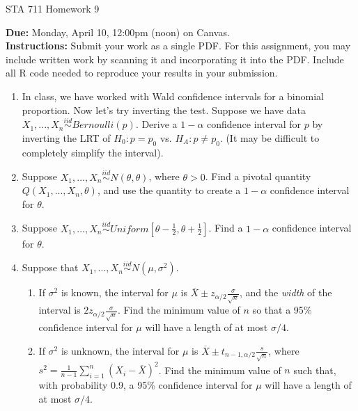 \documentclass[11pt]{article}
\begin{document}
\begin{center}
\Large
STA 711 Homework 9\\
\normalsize
\vspace{5mm}
\end{center}

\noindent \textbf{Due:} Monday, April 10, 12:00pm (noon) on Canvas.\\ 

\noindent \textbf{Instructions:} Submit your work as a single PDF. For this assignment, you may include written work by scanning it and incorporating it into the PDF. Include all R code needed to reproduce your results in your submission.


\begin{enumerate}
\item In class, we have worked with Wald confidence intervals for a binomial proportion. Now let's try inverting the test. Suppose we have data $X_1,...,X_n \overset{iid}{\sim} Bernoulli(p)$. Derive a $1 - \alpha$ confidence interval for $p$ by inverting the LRT of $H_0: p = p_0$ vs. $H_A: p \neq p_0$. (It may be difficult to completely simplify the interval).

\item Suppose $X_1,...,X_n \overset{iid}{\sim} N(\theta, \theta)$, where $\theta > 0$. Find a pivotal quantity $Q(X_1,...,X_n, \theta)$, and use the quantity to create a $1 - \alpha$ confidence interval for $\theta$.

\item Suppose $X_1,...,X_n \overset{iid}{\sim} Uniform[\theta - \frac{1}{2}, \theta + \frac{1}{2}]$. Find a $1 - \alpha$ confidence interval for $\theta$.

\item Suppose that $X_1,...,X_n \overset{iid}{\sim} N(\mu, \sigma^2)$. 

\begin{enumerate}
\item If $\sigma^2$ is known, the interval for $\mu$ is $\overline{X} \pm z_{\alpha/2} \frac{\sigma}{\sqrt{n}}$, and the \textit{width} of the interval is $2z_{\alpha/2} \frac{\sigma}{\sqrt{n}}$. Find the minimum value of $n$ so that a 95\% confidence interval for $\mu$ will have a length of at most $\sigma/4$.

\item If $\sigma^2$ is unknown, the interval for $\mu$ is $\overline{X} \pm t_{n-1, \alpha/2} \frac{s}{\sqrt{n}}$, where $s^2 = \frac{1}{n-1} \sum \limits_{i=1}^n (X_i - \overline{X})^2$. Find the minimum value of $n$ such that, with probability 0.9, a 95\% confidence interval for $\mu$ will have a length of at most $\sigma/4$.
\end{enumerate}


\end{enumerate}
\end{document}
